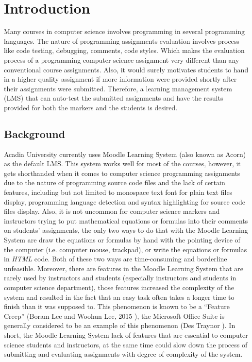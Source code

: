

\chapter{Introduction}
\label{chap:INTRO}

Many courses in computer science involves programming in several programming
languages.
The nature of programming assignments evaluation
involves process like code testing, debugging, comments, code styles.
Which makes the evaluation process of a programming computer science assignment
very different than any conventional course assignments.
Also, it would surely motivates students to hand in a higher quality assignment
if more information were provided shortly after their assignments were
submitted.
Therefore, a learning management system (LMS) that can auto-test the
submitted assignments and have the results provided for both the markers and
the students is desired.

\section{Background}

Acadia University currently uses Moodle Learning System (also known as 
Acorn) as the default LMS.
This system works well for most of the courses, however, it gets
shorthanded when it comes to computer science programming assignments due to
the nature of programming source code files and the lack of certain
features, including but not limited to monospace text font for plain text
files display, programming language detection and syntax
highlighting for source code files display.
Also, it is not uncommon for computer science markers and instructors
trying to put mathematical equations or formulas into their comments on
students' assignments, the only two ways to do that with the Moodle
Learning System are draw the equations or formulas by hand with the
pointing device of the computer (i.e. computer mouse, trackpad), or write
the equations or formulas in \emph{HTML} code. Both of these two ways are
time-consuming and borderline unfeasible.
Moreover, there are features in the Moodle Learning System that are rarely
used by instructors and students (especially instructors and students in
computer science department), those features increased the
complexity of the system and resulted in the fact that an easy task 
often takes a longer time to finish than it was supposed to. This phenomenon
is known to be a ``Feature Creep''  (Boram Lee and Woohun Lee, 2015 
\cite{featureCreep}), the Microsoft Office Suite is generally
considered to be an example of this phenomenon (Des Traynor 
\cite{msFeatureCreep}).
In short, the Moodle Learning System lack of features that are essential
to computer science students and instructors, at the same time could slow
down the process of submitting and evaluating assignments with degree of 
complexity of the system.

